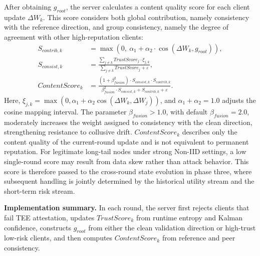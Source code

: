 \documentclass[final,5p,times,twocolumn]{elsarticle/elsarticle}
\begin{document}
After obtaining $g_{root}$, the server calculates a content quality score for each client update $\Delta W_k$. This score considers both global contribution, namely consistency with the reference direction, and group consistency, namely the degree of agreement with other high-reputation clients:
\begin{align}
    S_{contrib,k}    & = \max\left(0,\ \alpha_{1} + \alpha_{2} \cdot \cos(\Delta W_{k}, g_{root})\right),                                                              \\
    S_{consist,k}    & = \frac{\sum_{j\neq k} TrustScore_{j} \cdot \xi_{j,k}}{\sum_{j\neq k} TrustScore_{j} + \varepsilon},                                            \\
    ContentScore_{k} & = \frac{(1 + \beta_{fusion}^{2}) \cdot S_{consist,k} \cdot S_{contrib,k}}{\beta_{fusion}^{2}\cdot S_{consist,k} + S_{contrib,k} + \varepsilon}.
\end{align}
Here, $\xi_{j,k}=\max(0,\alpha_1+\alpha_2\cos(\Delta W_k,\Delta W_j))$, and $\alpha_1+\alpha_2=1.0$ adjusts the cosine mapping interval. The parameter $\beta_{fusion}>1.0$, with default $\beta_{fusion}=2.0$, moderately increases the weight assigned to consistency with the clean direction, strengthening resistance to collusive drift. $ContentScore_k$ describes only the content quality of the current-round update and is not equivalent to permanent reputation. For legitimate long-tail nodes under strong Non-IID settings, a low single-round score may result from data skew rather than attack behavior. This score is therefore passed to the cross-round state evolution in phase three, where subsequent handling is jointly determined by the historical utility stream and the short-term risk stream.


\noindent\textbf{Implementation summary.} In each round, the server first rejects clients that fail TEE attestation, updates $TrustScore_k$ from runtime entropy and Kalman confidence, constructs $g_{root}$ from either the clean validation direction or high-trust low-risk clients, and then computes $ContentScore_k$ from reference and peer consistency.
\end{document}
